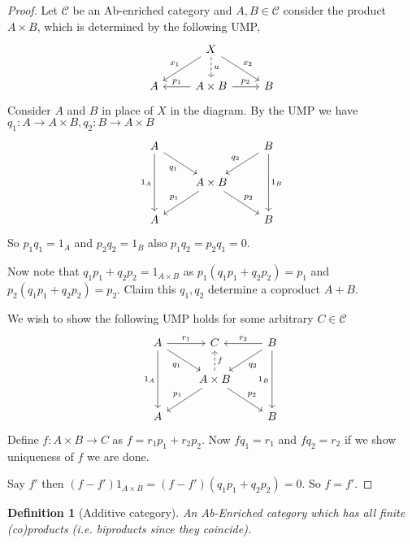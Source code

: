 \documentclass[12pt]{article}
\numberwithin{equation}{section}
\newcounter{dummy} \numberwithin{dummy}{section}
\newtheorem{definition}[dummy]{Definition}
\begin{document}
	\begin{proof}	
		Let $\mathcal{C}$ be an Ab-enriched category and $A,B\in \mathcal{C}$ consider the product $A\times B$, which is determined by the following UMP,
		\[\begin{tikzcd}
			& X \\
			A & A\times B & B
			\arrow["{p_1}"', from=2-2, to=2-1]
			\arrow["{p_2}", from=2-2, to=2-3]
			\arrow["u", dashed, from=1-2, to=2-2]
			\arrow["{x_1}"', from=1-2, to=2-1]
			\arrow["{x_2}", from=1-2, to=2-3]
		\end{tikzcd}\]
		Consider $A$ and $B$ in place of $X $ in the diagram. By the UMP we have $q_1: A \to A\times B, q_2: B \to A\times B$
		\[\begin{tikzcd}
			A && B \\
			& {A\times B} \\
			A && B
			\arrow["{p_1}"', from=2-2, to=3-1]
			\arrow["{p_2}", from=2-2, to=3-3]
			\arrow["{q_2}"', from=1-3, to=2-2]
			\arrow["{q_1}"', from=1-1, to=2-2]
			\arrow["{1_A}"', from=1-1, to=3-1]
			\arrow["{1_B}", from=1-3, to=3-3]
		\end{tikzcd}\]
		So $p_1q_1=1_A$ and $p_2q_2=1_B$ also $p_1q_2=p_2q_1=0$.
		
		Now note that $q_1p_1+q_2p_2=1_{A\times B}$ as $p_1(q_1p_1+q_2p_2)=p_1$ and $p_2(q_1p_1+q_2p_2)=p_2$. Claim this $q_1,q_2$ determine a coproduct $A +B$.
		
		We wish to show the following UMP holds for some arbitrary $C \in \mathcal{C}$
		\[\begin{tikzcd}
			A & C & B \\
			& {A\times B} \\
			A && B
			\arrow["{q_1}"', from=1-1, to=2-2]
			\arrow["{q_2}", from=1-3, to=2-2]
			\arrow["{p_1}"', from=2-2, to=3-1]
			\arrow["{p_2}", from=2-2, to=3-3]
			\arrow["{1_B}"', from=1-3, to=3-3]
			\arrow["{1_A}"', from=1-1, to=3-1]
			\arrow["{r_1}", from=1-1, to=1-2]
			\arrow["{r_2}"', from=1-3, to=1-2]
			\arrow["{f}"',dashed, from=2-2, to=1-2]
		\end{tikzcd}\]
		Define $f: A\times B \to C$ as $f=r_1p_1+r_2p_2$. Now $fq_1=r_1$ and $fq_2=r_2$ if we show uniqueness of $f$ we are done.
		
		Say $f'$ then $(f-f')1_{A \times B}=(f-f')(q_1p_1+q_2p_2)=0$. So $f=f'$.
		
		
	\end{proof}
	
	
	\begin{definition}[Additive category]
		An Ab-Enriched category which has all finite (co)products (i.e. biproducts since they coincide).
	\end{definition}
	
\end{document}
